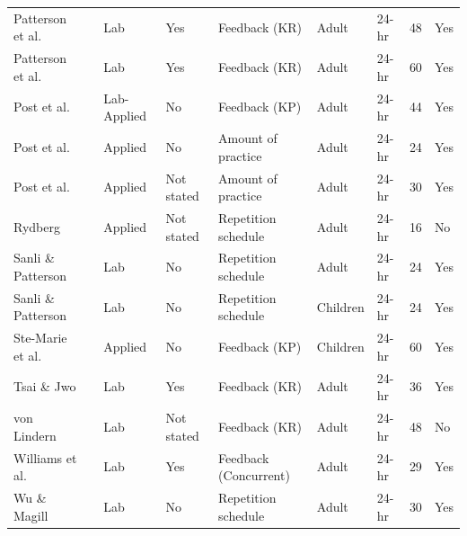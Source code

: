 \documentclass[man,floatsintext,hidelinks]{apa7}
\begin{document}
\begin{landscape}
\begin{longtable}[l]{lllllllll}
Patterson et al.      & \citeyear{Patterson2013-nh}           & Lab         & Yes          & Feedback (KR)         & Adult        & 24-hr              & 48  & Yes       \\
Patterson et al.      & \citeyear{Patterson2011-vt}           & Lab         & Yes          & Feedback (KR)         & Adult        & 24-hr              & 60  & Yes       \\
Post et al.           & \citeyear{Post2016-vg}           & Lab-Applied & No           & Feedback (KP)         & Adult        & 24-hr              & 44  & Yes       \\
Post et al.           & \citeyear{Post2011-qc}           & Applied     & No           & Amount of practice    & Adult        & 24-hr              & 24  & Yes       \\
Post et al.           & \citeyear{Post2014-yi}           & Applied     & Not stated   & Amount of practice    & Adult        & 24-hr              & 30  & Yes       \\
Rydberg               & \citeyear{Rydberg2011-zg}           & Applied     & Not stated   & Repetition schedule   & Adult        & 24-hr              & 16  & No        \\
Sanli \& Patterson    & \citeyear{Sanli2013-qh}           & Lab         & No           & Repetition schedule   & Adult        & 24-hr              & 24  & Yes       \\
Sanli \& Patterson    & \citeyear{Sanli2013-qh}           & Lab         & No           & Repetition schedule   & Children     & 24-hr              & 24  & Yes       \\
Ste-Marie et al.      & \citeyear{Ste-Marie2013-uc}           & Applied     & No           & Feedback (KP)         & Children     & 24-hr              & 60  & Yes       \\
Tsai \& Jwo           & \citeyear{Tsai2015-rj}           & Lab         & Yes          & Feedback (KR)         & Adult        & 24-hr              & 36  & Yes       \\
von Lindern           & \citeyear{Von_Lindern2017-al}           & Lab         & Not stated   & Feedback (KR)         & Adult        & 24-hr              & 48  & No        \\
Williams et al.       & \citeyear{Williams2017-pj}           & Lab         & Yes          & Feedback (Concurrent) & Adult        & 24-hr              & 29  & Yes       \\
Wu \& Magill          & \citeyear{Wu2011-ha}           & Lab         & No           & Repetition schedule   & Adult        & 24-hr              & 30  & Yes       \\

\end{longtable}
\end{landscape}
\end{document}
